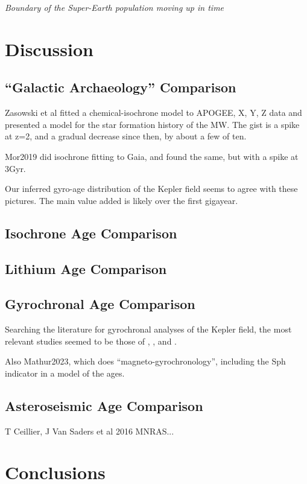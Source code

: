 \documentclass[11pt,twocolumn,tighten]{aastex63}
\begin{document}
{\it Boundary of the Super-Earth population moving up in time}
\citep{David_2021}


\section{Discussion}
\label{sec:disc}

\subsection{``Galactic Archaeology'' Comparison}
Zasowski et al fitted a chemical-isochrone model to APOGEE, X, Y, Z
data and presented a model for the star formation history of the MW.
The gist is a spike at z=2, and a gradual decrease since then, by
about a few of ten.

Mor2019 did isochrone fitting to Gaia, and found the same, but with a
spike at 3Gyr.

Our inferred gyro-age distribution of the Kepler field seems to agree
with these pictures.  The main value added is likely over the first
gigayear.

\subsection{Isochrone Age Comparison}

\subsection{Lithium Age Comparison}

\subsection{Gyrochronal Age Comparison}
Searching the literature for gyrochronal analyses of the Kepler field,
the most relevant studies seemed to be those of
\citet{Walkowicz_2013}, \citet{Reinhold_2015}, and 
\citet{David_2021}.

Also Mathur2023, which does ``magneto-gyrochronology'', including the
Sph indicator in a model of the ages.


\subsection{Asteroseismic Age Comparison}
T Ceillier, J Van Saders et al 2016 MNRAS...


\section{Conclusions}
\label{sec:conclusions}
\end{document}
